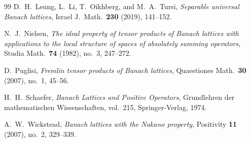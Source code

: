 \documentclass[12pt]{amsart}
\theoremstyle{plain}
\theoremstyle{definition}
\theoremstyle{remark}
\begin{document}
\begin{thebibliography}{99}
D.~H.~Leung, L.~Li, T.~Oikhberg, and M.~A.~Tursi,
\textit{Separable universal Banach lattices},
Israel J.~Math.\ \textbf{230} (2019), 141--152.

N.~J.~Nielsen,
\textit{The ideal property of tensor products of Banach lattices with
applications to the local structure of spaces of absolutely summing operators},
Studia Math.\ \textbf{74} (1982), no.~3, 247--272.

D.~Puglisi,
\textit{Fremlin tensor products of Banach lattices},
Quaestiones Math.\ \textbf{30} (2007), no.~1, 45--56.

H.~H.~Schaefer,
\textit{Banach Lattices and Positive Operators},
Grundlehren der mathematischen Wissenschaften, vol.~215, Springer-Verlag, 1974.

A.~W.~Wickstead,
\textit{Banach lattices with the Nakano property},
Positivity \textbf{11} (2007), no.~2, 329--339.

\end{thebibliography}
\end{document}
